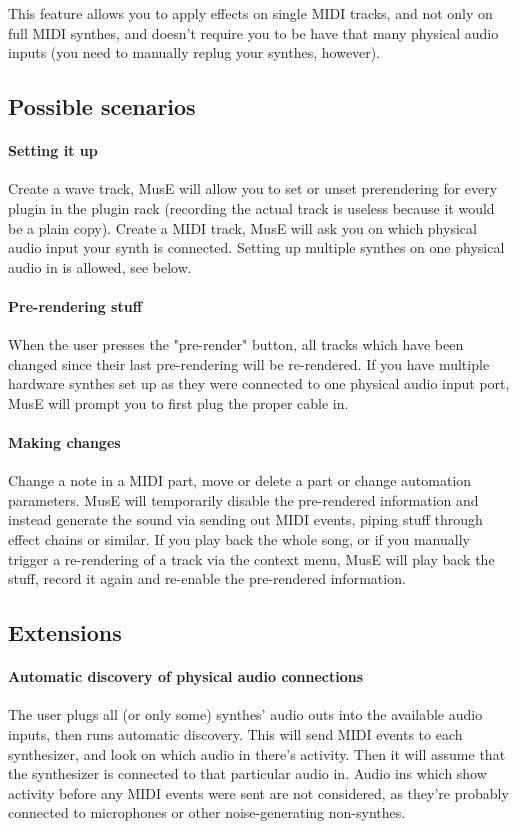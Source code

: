 \documentclass[a4paper]{report}
\begin{document}
This feature allows you to apply effects on single MIDI tracks, and not
only on full MIDI synthes, and doesn't require you to be have that
many physical audio inputs (you need to manually replug your synthes,
however).

\subsection{Possible scenarios}
\paragraph{Setting it up}
Create a wave track, MusE will allow you to set or unset prerendering
for every plugin in the plugin rack (recording the actual track is
useless because it would be a plain copy).
Create a MIDI track, MusE will ask you on which physical audio input
your synth is connected. Setting up multiple synthes on one physical
audio in is allowed, see below.

\paragraph{Pre-rendering stuff}
When the user presses the "pre-render" button, all tracks which have
been changed since their last pre-rendering will be re-rendered.
If you have multiple hardware synthes set up as they were connected
to one physical audio input port, MusE will prompt you to first plug
the proper cable in.

\paragraph{Making changes}
Change a note in a MIDI part, move or delete a part or change automation
parameters. MusE will temporarily disable the pre-rendered information
and instead generate the sound via sending out MIDI events, piping stuff
through effect chains or similar. If you play back the whole song, or
if you manually trigger a re-rendering of a track via the context menu,
MusE will play back the stuff, record it again and re-enable the
pre-rendered information.


\subsection{Extensions}
\paragraph{Automatic discovery of physical audio connections}
The user plugs all (or only some) synthes' audio outs into the available
audio inputs, then runs automatic discovery. This will send MIDI events
to each synthesizer, and look on which audio in there's activity. Then
it will assume that the synthesizer is connected to that particular
audio in. Audio ins which show activity before any MIDI events were
sent are not considered, as they're probably connected to microphones
or other noise-generating non-synthes.
\end{document}
